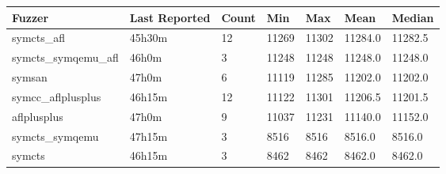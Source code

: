 
\begin{table*}[h]
\centering
\begin{tabular}{|l|l|l|l|l|l|l|}
\hline
\textbf{Fuzzer} & \textbf{Last Reported} & \textbf{Count} & \textbf{Min} & \textbf{Max} & \textbf{Mean} & \textbf{Median} \\
\hline
symcts\_afl        & 45h30m             & 12     & 11269 & 11302 & 11284.0       & 11282.5    \\
symcts\_symqemu\_afl & 46h0m              & 3      & 11248 & 11248 & 11248.0       & 11248.0    \\
symsan             & 47h0m              & 6      & 11119 & 11285 & 11202.0       & 11202.0    \\
symcc\_aflplusplus & 46h15m             & 12     & 11122 & 11301 & 11206.5       & 11201.5    \\
aflplusplus        & 47h0m              & 9      & 11037 & 11231 & 11140.0       & 11152.0    \\
symcts\_symqemu    & 47h15m             & 3      & 8516  & 8516  & 8516.0        & 8516.0     \\
symcts             & 46h15m             & 3      & 8462  & 8462  & 8462.0        & 8462.0     \\
\hline
\end{tabular}
\end{table*}